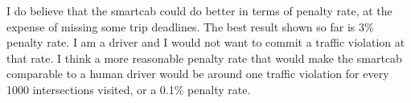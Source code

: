\documentclass[conference]{IEEEtran}
\begin{document}
I do believe that the smartcab could do better in terms of penalty rate, at the
expense of missing some trip deadlines.  The best result shown so far is 3\%
penalty rate.  I am a driver and I would not want to commit a traffic violation
at that rate.  I think a more reasonable penalty rate that would make the
smartcab comparable to a human driver would be around one traffic violation for
every 1000 intersections visited, or a 0.1\% penalty rate. 


% 
% 


\end{document}
